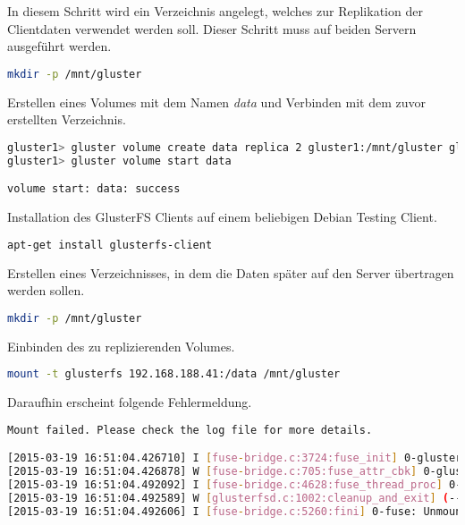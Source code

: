 In diesem Schritt wird ein Verzeichnis angelegt, welches zur Replikation der Clientdaten verwendet werden soll. Dieser Schritt muss auf beiden Servern ausgeführt werden.
\begin{lstlisting}[language=bash, caption=Erstellen eines Replikationsverzeichnisses]
mkdir -p /mnt/gluster
\end{lstlisting}

Erstellen eines Volumes mit dem Namen \textit{data} und Verbinden mit dem zuvor erstellten Verzeichnis.
\begin{lstlisting}[language=bash, caption=Erstellen des data Volumes]
gluster1> gluster volume create data replica 2 gluster1:/mnt/gluster gluster2:/mnt/gluster force
gluster1> gluster volume start data

volume start: data: success
\end{lstlisting}

Installation des GlusterFS Clients auf einem beliebigen Debian Testing Client.
\begin{lstlisting}[language=bash, caption=Installation des GlusterFS Clients]
apt-get install glusterfs-client
\end{lstlisting}

Erstellen eines Verzeichnisses, in dem die Daten später auf den Server übertragen werden sollen.
\begin{lstlisting}[language=bash, caption=Erstellen einer Verzeichnisses]
mkdir -p /mnt/gluster
\end{lstlisting}

Einbinden des zu replizierenden Volumes.
\begin{lstlisting}[language=bash, caption=Einbinden des zu replizierenden Volumes]
mount -t glusterfs 192.168.188.41:/data /mnt/gluster
\end{lstlisting}

Daraufhin erscheint folgende Fehlermeldung.
\begin{lstlisting}[language=bash, caption=Fehler der beim Einbinden des Verzeichnisses auftritt]
Mount failed. Please check the log file for more details.

[2015-03-19 16:51:04.426710] I [fuse-bridge.c:3724:fuse_init] 0-glusterfs-fuse: FUSE inited with protocol versions: glusterfs 7.13 kernel 7.22
[2015-03-19 16:51:04.426878] W [fuse-bridge.c:705:fuse_attr_cbk] 0-glusterfs-fuse: 2: LOOKUP() / => -1 (No such file or directory)
[2015-03-19 16:51:04.492092] I [fuse-bridge.c:4628:fuse_thread_proc] 0-fuse: unmounting /mnt/gluster2
[2015-03-19 16:51:04.492589] W [glusterfsd.c:1002:cleanup_and_exit] (-->/lib/x86_64-linux-gnu/libc.so.6(clone+0x6d) [0x7fa6a045647d] (-->/lib/x86_64-linux-gnu/libpthread.so.0(+0x8182) [0x7fa6a0729182] (-->/usr/sbin/glusterfs(glusterfs_sigwaiter+0xd5) [0x7fa6a1212ef5]))) 0-: received signum (15), shutting down
[2015-03-19 16:51:04.492606] I [fuse-bridge.c:5260:fini] 0-fuse: Unmounting '/mnt/gluster2'.
\end{lstlisting}

